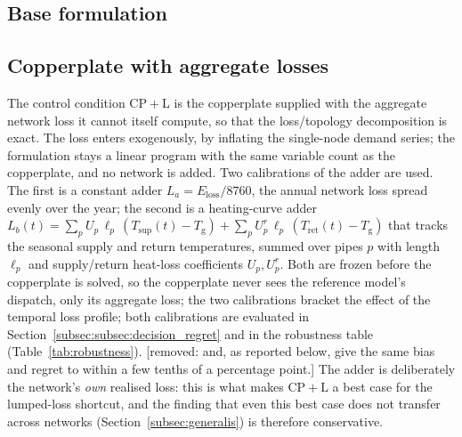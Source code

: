 \documentclass[a4paper,fleqn]{cas-sc}
\newcommand{\CPL}{\ensuremath{\mathrm{CP{+}L}}} %
\newcommand{\new}[1]{\textcolor[HTML]{1A5FB4}{#1}}   %
\newcommand{\gone}[1]{\textcolor[HTML]{9A9996}{[removed: #1]}}
\newcommand{\new}[1]{#1}
\newcommand{\gone}[1]{}
\begin{document}
\subsection{Base formulation}
\new{}

\subsection{Copperplate with aggregate losses}\label{subsec:lumped}
The control condition $\CPL$ is the copperplate supplied with the aggregate network loss it
cannot itself compute, so that the loss/topology decomposition is exact. The loss enters
exogenously, by inflating the single-node demand series; the formulation stays a linear
program with the same variable count as the copperplate, and no network is added. Two
calibrations of the adder are used. The first is a constant adder $L_a = E_\text{loss}/8760$, the
annual network loss spread evenly over the year; the second is a heating-curve adder
$L_b(t)=\sum_p U_p\,\ell_p\,(T_\text{sup}(t)-T_\text{g})+\sum_p U^r_p\,\ell_p\,(T_\text{ret}(t)-T_\text{g})$
that tracks the seasonal supply and return temperatures, summed over pipes $p$ with
length $\ell_p$ and supply/return heat-loss coefficients $U_p,U^r_p$. Both are frozen before
the copperplate is solved, so the copperplate never sees the reference model's dispatch, only
its aggregate loss; the two calibrations bracket the effect of the temporal loss profile;
\new{both calibrations are evaluated in Section~\ref{subsec:subsec:decision_regret} and in the robustness table
(Table~\ref{tab:robustness}).}
\gone{and, as reported below, give the same bias and regret to within a few tenths of a percentage point.}
The adder is deliberately the network's \emph{own} realised loss: this is what makes $\CPL$ a
best case for the lumped-loss shortcut, and the finding that even this best case does not
transfer across networks (Section~\ref{subsec:generalis}) is therefore conservative. 
\end{document}
